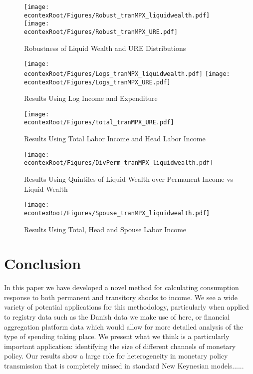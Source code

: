 \documentclass[titlepage]{\econtex}\newcommand{\texname}{ConsumptionHeterogeneity}
\begin{document}
\begin{figure} 
	\begin{centering}
		\texttt{[image: \\econtexRoot/Figures/Robust\_tranMPX\_liquidwealth.pdf]}
		\texttt{[image: \\econtexRoot/Figures/Robust\_tranMPX\_URE.pdf]}
		\caption{Robustness of Liquid Wealth and URE Distributions}
		\label{fig:Robust_liquidURE}
	\end{centering}
\end{figure}

\begin{figure} 
	\begin{centering}
		\texttt{[image: \\econtexRoot/Figures/Logs\_tranMPX\_liquidwealth.pdf]}
		\texttt{[image: \\econtexRoot/Figures/Logs\_tranMPX\_URE.pdf]}
		\caption{Results Using Log Income and Expenditure}
		\label{fig:Robust_Logs}
	\end{centering}
\end{figure}

\begin{figure} 
	\begin{centering}
		\texttt{[image: \\econtexRoot/Figures/total\_tranMPX\_URE.pdf]}
		\caption{Results Using Total Labor Income and Head Labor Income}
		\label{fig:Robust_TotalvsHead}
	\end{centering}
\end{figure}

\begin{figure} 
	\begin{centering}
		\texttt{[image: \\econtexRoot/Figures/DivPerm\_tranMPX\_liquidwealth.pdf]}
		\caption{Results Using Quintiles of Liquid Wealth over Permanent Income vs Liquid Wealth}
		\label{fig:Robust_DivPerm}
	\end{centering}
\end{figure}

\begin{figure} 
	\begin{centering}
		\texttt{[image: \\econtexRoot/Figures/Spouse\_tranMPX\_liquidwealth.pdf]}
		\caption{Results Using Total, Head and Spouse Labor Income}
		\label{fig:Robust_Spouse}
	\end{centering}
\end{figure}

\FloatBarrier

\section{Conclusion}
In this paper we have developed a novel method for calculating consumption response to both permanent and transitory shocks to income. We see a wide variety of potential applications for this methodology, particularly when applied to registry data such as the Danish data we make use of here, or financial aggregation platform data which would allow for more detailed analysis of the type of spending taking place. We present what we think is a particularly important application: identifying the size of different channels of monetary policy. Our results show a large role for heterogeneity in monetary policy transmission that is completely missed in standard New Keynesian models......
\end{document}
